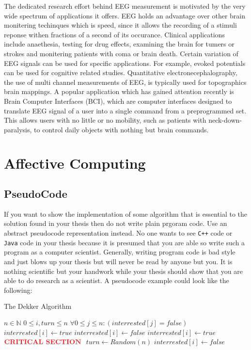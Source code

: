 \documentclass[12pt, a4paper, fleqn]{memoir}%
\begin{document}
The dedicated research effort behind EEG measurement is motivated by the very wide spectrum of applications it offers. EEG holds an advantage over other brain monitering techinques which is speed, since it allows the recording of a stimuli reponse withen fractions of a second of its occurance. Clinical applications include anaethesia, testing for drug effects, examining the brain for tumers or strokes and monitering patients with coma or brain death. Certain variation of EEG signals can be used for specific applications. For example, evoked potentials can be used for cognitive related studies. Quantitative electronecephalography, the use of multi channel measurements of EEG, is typically used for topographics brain mappings. A popular application which has gained attention recently is Brain Computer Interfaces (BCI), which are computer interfaces designed to translate EEG signal of a user into a single command from a preprogrammed set. This allows users with no little or no mobility, such as patients with neck-down-paralysis, to control daily objects with nothing but brain commands.

\section{Affective Computing}
\label{sec:Affective}

\subsection{PseudoCode}
\label{sec:PseudoCode}
If you want to show the implementation of some algorithm that is essential to the solution found in your thesis then do not write plain prgoram code. Use an abstract pseudocode representation instead. No one wants to see \texttt{C++\texttrademark} code or \texttt{Java\texttrademark} code in your thesis because it is presumed that you are able so write such a program as a computer scientist. Generally, writing program code is bad style and just blows up your thesis but will never be read by anyone but you. It is nothing scientific but your handwork while your thesis should show that you are able to do research as a scientist. A pseudocode example could look like the following:
\begin{algorithm}[h]
\caption{The Dekker Algorithm}
\label{algo:dekker}
\begin{algorithmic}
\Require $n \in \mathbb{N}$
\Require $0 \leq i,turn \leq n$
\Require $\forall 0 \leq j \leq n : (interrested[j] = false)$
  \State $interrested[i] \leftarrow true$
    \State $interrested[i] \leftarrow false$
    \EndWhile
    \State $interrested[i] \leftarrow true$
  \EndIf 
  \EndWhile
  \State $ $
  \State $\text{\textbf{\color{red}CRITICAL SECTION}}$
  \State $ $
  \State $turn \leftarrow Random(n)$
  \State $interrested[i] \leftarrow false$
\EndProcedure
\end{algorithmic}
\end{algorithm}
\end{document}
